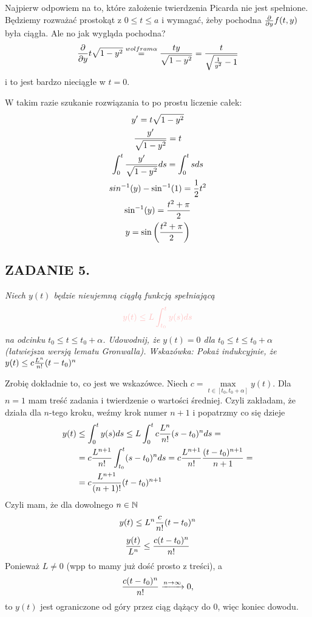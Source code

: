 \documentclass{article}
\begin{document}
Najpierw odpowiem na to, które założenie twierdzenia Picarda nie jest spełnione. Będziemy rozważać prostokąt z $0\leq t\leq a$ i wymagać, żeby pochodna ${\partial\over\partial y}f(t, y)$ była ciągła. Ale no jak wygląda pochodna?
$${\partial\over\partial y}t\sqrt{1-y^2}\overset{wolfram\alpha}{=}{ty\over\sqrt{1-y^2}}={t\over\sqrt{{1\over y^2}-1}}$$
i to jest bardzo nieciągłe w $t=0$.

W takim razie szukanie rozwiązania to po prostu liczenie całek:
\begin{multline*}
    y'=t\sqrt{1-y^2}\\
    {y'\over\sqrt{1-y^2}}=t\\
    \int_0^t{y'\over\sqrt{1-y^2}}ds=\int_0^tsds\\
    sin^{-1}(y)-\sin^{-1}(1)=\frac12t^2\\
    \sin^{-1}(y)={t^2+\pi\over2}\\
    y=\sin\left({t^2+\pi\over2}\right)\\
\end{multline*}

\subsection*{ZADANIE 5.}
\emph{\color{pink}Niech $y(t)$ będzie nieujemną ciągłą funkcją spełniającą}
$$\color{pink}y(t)\leq L\int_{t_0}^ty(s)ds$$
\emph{\color{pink}na odcinku $t_0\leq t\leq t_0+\alpha$. Udowodnij, że $y(t)=0$ dla $t_0\leq t\leq t_0+\alpha$ (łatwiejsza wersją lematu Gronwalla). Wskazówka: Pokaż indukcyjnie, że $y(t)\leq c{L^n\over n!}(t-t_0)^n$}

Zrobię dokładnie to, co jest we wskazówce. Niech $c=\max\limits_{t\in[t_0,t_0+\alpha]}y(t)$. Dla $n=1$ mam treść zadania i twierdzenie o wartości średniej. Czyli zakładam, że działa dla $n$-tego kroku, weźmy krok numer $n+1$ i popatrzmy co się dzieje
\begin{align*}
    y(t)&\leq \int_0^ty(s)ds\leq L\int_0^tc{L^n\over n!}(s-t_0)^nds=\\
    &=c{L^{n+1}\over n!}\int_{t_0}^t(s-t_0)^nds=c{L^{n+1}\over n!}{(t-t_0)^{n+1}\over n+1}=\\
    &=c{L^{n+1}\over (n+1)!}(t-t_0)^{n+1}
\end{align*}
Czyli mam, że dla dowolnego $n\in\mathbb{N}$
$$y(t)\leq L^n{c\over n!}(t-t_0)^n$$
$${y(t)\over L^n}\leq {c(t-t_0)^n\over n!}$$
Ponieważ $L\neq 0$ (wpp to mamy już dość prosto z treści), a 
$${c(t-t_0)^n\over n!}\xrightarrow[]{n\to\infty}0,$$
to $y(t)$ jest ograniczone od góry przez ciąg dążący do $0$, więc koniec dowodu.
\end{document}
